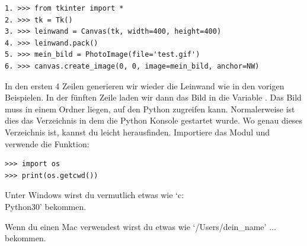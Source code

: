 \begin{Verbatim}[frame=single]
1. >>> from tkinter import *
2. >>> tk = Tk()
3. >>> leinwand = Canvas(tk, width=400, height=400)
4. >>> leinwand.pack()
5. >>> mein_bild = PhotoImage(file='test.gif')
6. >>> canvas.create_image(0, 0, image=mein_bild, anchor=NW)
\end{Verbatim}

In den ersten 4 Zeilen generieren wir wieder die Leinwand wie in den vorigen Beispielen. In der fünften Zeile laden wir dann das Bild in die Variable . Das Bild muss in einem Ordner liegen, auf den Python zugreifen kann. Normalerweise ist dies das Verzeichnis in dem die Python Konsole gestartet wurde. Wo genau dieses Verzeichnis ist, kannst du leicht herausfinden. Importiere das  Modul und verwende die  Funktion: 

\begin{Verbatim}[frame=single]
>>> import os
>>> print(os.getcwd())
\end{Verbatim}

\begin{WINDOWS}
Unter Windows wirst du vermutlich etwas wie `c:\\Python30' bekommen.
\end{WINDOWS}

\begin{MAC}
Wenn du einen Mac verwendest wirst du etwas wie `/Users/dein\_name' $\ldots$ bekommen. 
\end{MAC}

